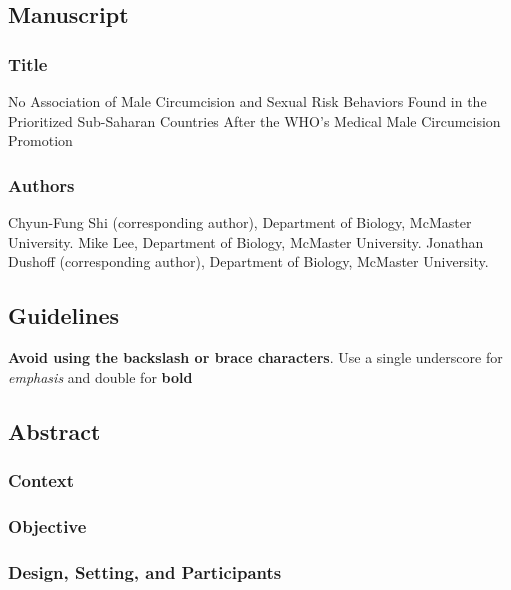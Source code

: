\documentclass[12pt,]{article}
\date{}
\begin{document}
\subsection{Manuscript}\label{manuscript}

\subsubsection{Title}\label{title}

No Association of Male Circumcision and Sexual Risk Behaviors Found in
the Prioritized Sub-Saharan Countries After the WHO's Medical Male
Circumcision Promotion

\subsubsection{Authors}\label{authors}

Chyun-Fung Shi (corresponding author), Department of Biology, McMaster
University. Mike Lee, Department of Biology, McMaster University.
Jonathan Dushoff (corresponding author), Department of Biology, McMaster
University.

\subsection{Guidelines}\label{guidelines}

\textbf{Avoid using the backslash or brace characters}. Use a single
underscore for \emph{emphasis} and double for \textbf{bold}

\subsection{Abstract}\label{abstract}

\subsubsection{Context}\label{context}

\subsubsection{Objective}\label{objective}

\subsubsection{Design, Setting, and
Participants}\label{design-setting-and-participants}
\end{document}
